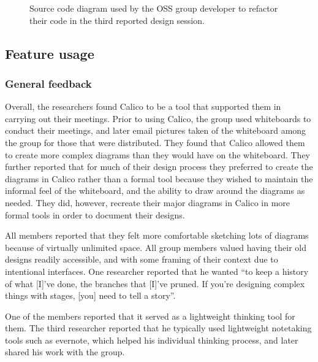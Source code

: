 \begin{figure}%
  \centering
   \caption {Source code diagram used by the OSS group developer to refactor their code in the third reported design session.}
   \label{fig:researchgroup:2}   
\end{figure}%

\subsection{Feature usage}

\subsubsection{General feedback}

Overall, the researchers found Calico to be a tool that supported them in carrying out their meetings. Prior to using Calico, the group used whiteboards to conduct their meetings, and later email pictures taken of the whiteboard among the group for those that were distributed. They found that Calico allowed them to create more complex diagrams than they would have on the whiteboard. They further reported that for much of their design process they preferred to create the diagrams in Calico rather than a formal tool because they wished to maintain the informal feel of the whiteboard, and the ability to draw around the diagrams as needed. They did, however, recreate their major diagrams in Calico in more formal tools in order to document their designs.

All members reported that they felt more comfortable sketching lots of diagrams because of virtually unlimited space. All group members valued having their old designs readily accessible, and with some framing of their context due to intentional interfaces. One researcher reported that he wanted ``to keep a history of what [I]'ve done, the branches that [I]'ve pruned. If you're designing complex things with stages, [you] need to tell a story''.

One of the members reported that it served as a lightweight thinking tool for them. The third researcher reported that he typically used lightweight notetaking tools such as evernote, which helped his individual thinking process, and later shared his work with the group. 


